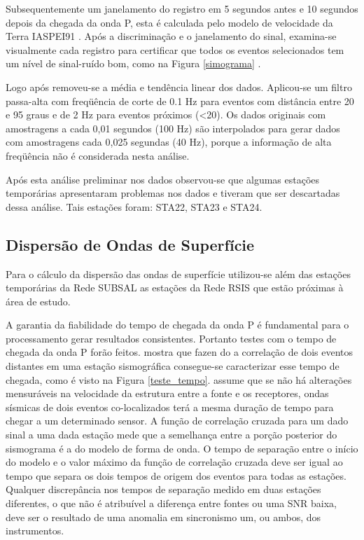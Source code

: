 Subsequentemente um janelamento do registro em 5 segundos antes e 10 segundos depois da chegada da onda P, esta é calculada pelo modelo de velocidade da Terra  IASPEI91 \citep{kennet_iaspei_1991}. Após a discriminação e o janelamento do sinal, examina-se visualmente cada registro para certificar que todos os eventos selecionados tem um nível de sinal-ruído bom, como na Figura \ref{simograma} . 

Logo após removeu-se a média e tendência linear dos dados. Aplicou-se um filtro passa-alta com freqüência de corte de 0.1 Hz para eventos com distância entre 20 e 95 graus e de 2 Hz para eventos próximos (<20). Os dados originais com amostragens a cada 0,01 segundos (100 Hz) são interpolados para gerar dados com amostragens cada 0,025 segundas (40 Hz), porque a informação de alta freqüência não é considerada nesta análise.

Após esta análise preliminar nos dados observou-se que algumas estações temporárias apresentaram problemas nos dados e tiveram que ser descartadas dessa análise. Tais estações foram: STA22, STA23 e STA24.


\subsection{Dispersão de Ondas de Superfície}

Para o cálculo da dispersão das ondas de superfície utilizou-se além das estações temporárias da Rede SUBSAL as estações da Rede RSIS que estão próximas à área de estudo.

A garantia da fiabilidade do tempo de chegada da onda P é fundamental para o processamento gerar resultados consistentes. Portanto testes com o tempo de chegada da onda P forão feitos. \cite{gibbons_identification_2006} mostra que fazen do a correlação de dois eventos distantes em uma estação sismográfica consegue-se caracterizar esse tempo de chegada, como é visto na Figura \ref{teste_tempo}. \cite{gibbons_identification_2006} assume que  se não há alterações mensuráveis na velocidade da estrutura entre a fonte e os receptores, ondas sísmicas de dois eventos co-localizados terá a mesma duração de tempo para chegar a um determinado sensor. A função de correlação cruzada para um dado sinal a uma dada estação mede que a semelhança entre a porção posterior do sismograma é a do modelo de forma de onda. O tempo de separação entre o início do modelo e o valor máximo da função de correlação cruzada deve ser igual ao tempo que separa os dois tempos de origem dos eventos para todas as estações. Qualquer discrepância nos tempos de separação medido em duas estações diferentes, o que não é atribuível a diferença entre fontes ou uma SNR baixa, deve ser o resultado de uma anomalia em sincronismo um, ou ambos, dos instrumentos.

